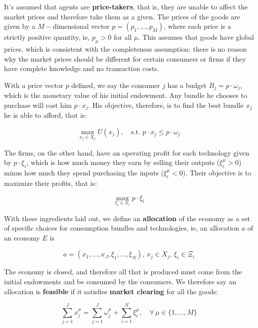 It's assumed that agents are \textbf{price-takers}, that is, they are unable to affect the market prices and therefore take them as a given. The prices of the goods are given by a $M-$dimensional vector $p = (p_1, \ldots, p_M)$, where each price is a strictly positive quantity, ie, $p_\mu>0$ for all $\mu$. This assumes that goods have global prices, which is consistent with the completeness assumption: there is no reason why the market prices should be different for certain consumers or firms if they have complete knowledge and no transaction costs.

With a price vector $p$ defined, we say the consumer $j$ has a budget $B_j = p\cdot \omega_j$, which is the monetary value of his initial endowment. Any bundle he chooses to purchase will cost him $p\cdot x_j$. His objective, therefore, is to find the best bundle $x_j$ he is able to afford, that is:

\begin{equation}
  \label{eq:consumer_obj}
  \max_{x_j \in X_j} U(x_j), \quad \text{s.t. } p\cdot x_j \leq p\cdot \omega_j
\end{equation}

The firms, on the other hand, have an operating profit for each technology given by $p \cdot \xi_i$, which is how much money they earn by selling their outputs ($\xi_i^\mu > 0$) minus how much they spend purchasing the inputs ($\xi_i^\mu < 0$). Their objective is to maximize their profits, that is:

\begin{equation}
  \label{eq:firm_obj}
  \max_{\xi_i \in \Xi_i} p \cdot \xi_i
\end{equation}

With these ingredients laid out, we define an \textbf{allocation} of the economy as a set of specific choices for consumption bundles and technologies, ie, an allocation $a$ of an economy $E$ is

\begin{equation}
  \label{eq:3}
  a = (x_1, \ldots, x_J, \xi_1, \ldots, \xi_N), \, x_j \in X_j, \,
  \xi_i \in \Xi_i
\end{equation}

The economy is closed, and therefore all that is produced must come from the initial endowments and be consumed by the consumers. We therefore say an allocation is \textbf{feasible} if it satisfies \textbf{market clearing} for all the goods:

\begin{equation}
  \label{eq:market_clearing}
  \sum_{j=1}^J x^\mu_j = \sum_{j=1}^J \omega_j^\mu + \sum_{i=1}^N
  \xi_i^\mu, \quad \forall \, \mu \in \{1,\ldots, M\}
\end{equation}


